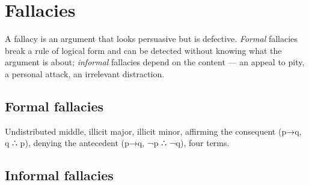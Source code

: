 \needspace{262pt}

\hypertarget{p1-06--4-fallacies}{%
\section{Fallacies}\label{p1-06--4-fallacies}}

A fallacy is an argument that looks persuasive but is defective. \emph{Formal} fallacies break a rule of logical
form and can be detected without knowing what the argument is about; \emph{informal} fallacies depend on the
content --- an appeal to pity, a personal attack, an irrelevant distraction.

\needspace{196pt}

\hypertarget{p1-06--formal-fallacies}{%
\subsection{Formal fallacies}\label{p1-06--formal-fallacies}}

Undistributed middle, illicit major, illicit minor, affirming the consequent (p→q, q ∴ p), denying the antecedent (p→q, ¬p ∴ ¬q), four terms.

\needspace{130pt}

\hypertarget{p1-06--informal-fallacies}{%
\subsection{Informal fallacies}\label{p1-06--informal-fallacies}}

\begingroup\small


